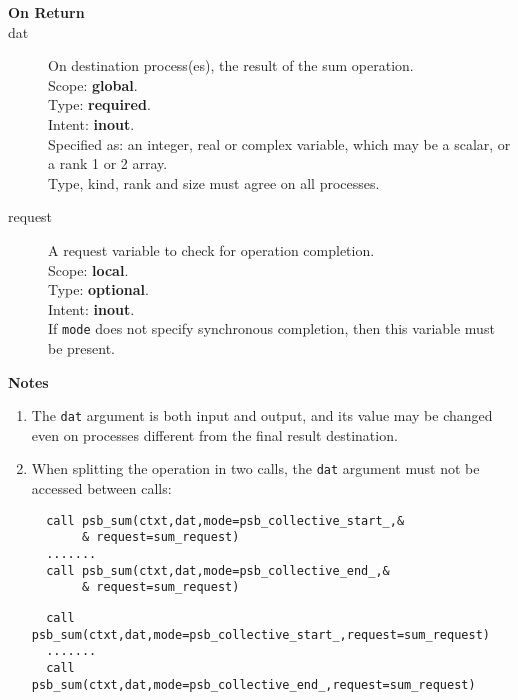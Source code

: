 \begin{description}
\item[\bf On Return]
\item[dat] On destination process(es), the result of the sum operation.\\
Scope: {\bf global}.\\
Type: {\bf required}.\\
Intent: {\bf inout}.\\
Specified as: an integer, real or complex variable, which may be a
scalar, or a rank 1 or 2 array. \\
Type, kind, rank and size must agree on all processes.
\item[request] A request variable to check for operation completion.\\
Scope: {\bf local}.\\
Type: {\bf optional}.\\
Intent: {\bf inout}.\\
If \verb|mode| does not specify synchronous completion, then this
variable must be present.
\end{description}

{\par\noindent\large\bfseries Notes}
\begin{enumerate}
\item The \verb|dat| argument is both input and output, and its
  value may be changed even on processes different from the final
  result destination.
\item When splitting the operation in two calls, the \verb|dat|
  argument  must not be accessed between calls:
\ifpdf
\begin{verbatim}
  call psb_sum(ctxt,dat,mode=psb_collective_start_,&
       & request=sum_request)
  .......
  call psb_sum(ctxt,dat,mode=psb_collective_end_,&
       & request=sum_request)
\end{verbatim}
\else
\begin{center}
    \begin{minipage}[tl]{0.9\textwidth}
\begin{verbatim} 
  call psb_sum(ctxt,dat,mode=psb_collective_start_,request=sum_request)
  .......
  call psb_sum(ctxt,dat,mode=psb_collective_end_,request=sum_request)
\end{verbatim}
    \end{minipage}
  \end{center}
\fi
\end{enumerate}



